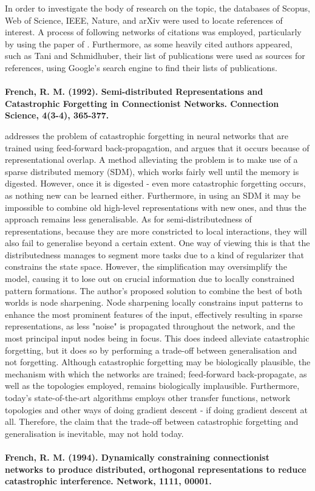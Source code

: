 In order to investigate the body of research on the topic, the databases of Scopus, Web of Science, IEEE, Nature, and arXiv were used to locate references of interest. A process of following networks of citations was employed, particularly by using the paper of \cite{McClelland1995}. Furthermore, as some heavily cited authors appeared, such as Tani and Schmidhuber, their list of publications were used as sources for references, using Google's search engine to find their lists of publications.
\\
\\
\textbf{French, R. M. (1992). Semi-distributed Representations and Catastrophic Forgetting in Connectionist Networks. Connection Science, 4(3-4), 365-377.}

\cite{French1992} addresses the problem of catastrophic forgetting \cite{McCloskey1989, Ratcliff1990} in neural networks that are trained using feed-forward back-propagation, and argues that it occurs because of representational overlap. A method alleviating the problem is to make use of a sparse distributed memory (SDM), which works fairly well until the memory is digested. However, once it is digested - even more catastrophic forgetting occurs, as nothing new can be learned either. Furthermore, in using an SDM it may be impossible to combine old high-level representations with new ones, and thus the approach remains less generalisable. As for semi-distributedness of representations, because they are more constricted to local interactions, they will also fail to generalise beyond a certain extent. One way of viewing this is that the distributedness manages to segment more tasks due to a kind of regularizer that constrains the state space. However, the simplification may oversimplify the model, causing it to lose out on crucial information due to locally constrained pattern formations. The author's proposed solution to combine the best of both worlds is node sharpening. Node sharpening locally constrains input patterns to enhance the most prominent features of the input, effectively resulting in sparse representations, as less "noise" is propagated throughout the network, and the most principal input nodes being in focus. This does indeed alleviate catastrophic forgetting, but it does so by performing a trade-off between generalisation and not forgetting. Although catastrophic forgetting may be biologically plausible, the mechanism with which the networks are trained; feed-forward back-propagate, as well as the topologies employed, remains biologically implausible. Furthermore, today's state-of-the-art algorithms employs other transfer functions, network topologies and other ways of doing gradient descent - if doing gradient descent at all. Therefore, the claim that the trade-off between catastrophic forgetting and generalisation is inevitable, may not hold today.
\\
\\
\textbf{French, R. M. (1994). Dynamically constraining connectionist networks to produce distributed, orthogonal representations to reduce catastrophic interference. Network, 1111, 00001.}

